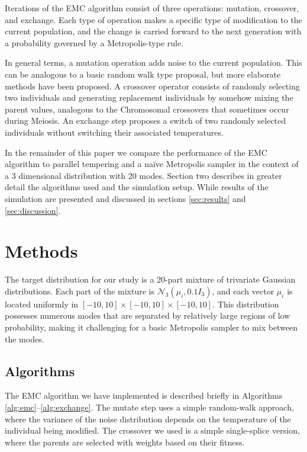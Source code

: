 \documentclass[12pt]{article}\usepackage[]{graphicx}\usepackage[]{color}
\begin{document}
Iterations of the EMC algorithm consist of three operations: mutation,
crossover, and exchange. Each type of operation makes a specific type
of modification to the current population, and the change is carried
forward to the next generation with a probability governed by a
Metropolis-type rule.

In general terms, a mutation operation adds noise to the current
population. This can be analogous to a basic random walk type
proposal, but more elaborate methods have been proposed. A crossover
operator consists of randomly selecting two individuals and generating
replacement individuals by somehow mixing the parent values, analogous
to the Chromosomal crossovers that sometimes occur during Meiosis.  An
exchange step proposes a switch of two randomly selected individuals
without switching their associated temperatures.


In the remainder of this paper we compare the performance of the EMC
algorithm to parallel tempering and a na\"ive Metropolis sampler in
the context of a 3 dimensional distribution with 20 modes.  Section
two describes in greater detail the algorithms used and the simulation
setup.  While results of the simulation are presented and discussed in
sections \ref{sec:results} and \ref{sec:discussion}.

\setcounter{section}{1}
\section{Methods}
\label{sec:methods}
The target distribution for our study is a 20-part mixture of
trivariate Gaussian distributions. Each part of the mixture is
$\mathcal{N}_3(\mu_i, 0.1I_3)$, and each vector $\mu_i$ is located
uniformly in $[-10,10]\times[-10,10]\times[-10,10].$ This distribution
possesses numerous modes that are separated by relatively large
regions of low probability, making it challenging for a basic
Metropolis sampler to mix between the modes.

\subsection{Algorithms}
\label{sec:algorithms}

The EMC algorithm we have implemented is described briefly in
Algorithms \ref{alg:emc}--\ref{alg:exchange}.  The mutate step uses a
simple random-walk approach, where the variance of the noise
distribution depends on the temperature of the individual being
modified.  The crossover we used is a simple single-splice version,
where the parents are selected with weights based on their fitness.
\end{document}
